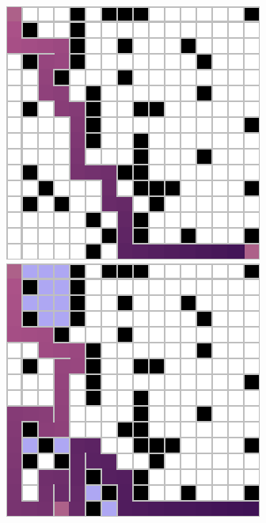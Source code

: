 \documentclass[letter]{article}
\begin{document}
\begin{questions}
	\begin{figure}
		\includegraphics[width=\linewidth]{../pics/16/DFS randomWalk 33 33 35.png}
		\caption{}\label{fig:q2-7}
		\endminipage\hfill
		\includegraphics[width=\linewidth]{../pics/16/DFS randomWalk Plus 70 53 44.png}

\end{figure}
\end{questions}
\end{document}
